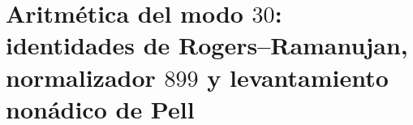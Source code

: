 \chapter{Aritmética del modo \(30\): identidades de Rogers--Ramanujan, normalizador \(899\) y levantamiento nonádico de Pell}
\label{chap:p3-final:46:modo_30_pell}



